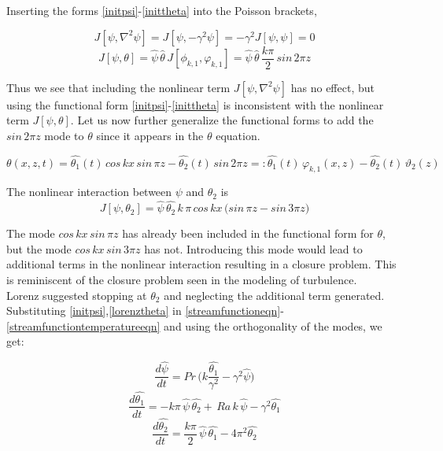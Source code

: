 \documentclass[paper=a4, fontsize=11pt]{scrartcl}
\numberwithin{equation}{section}		%
\numberwithin{figure}{section}			%
\numberwithin{table}{section}				%
\begin{document}
\noindent Inserting the forms \ref{initpsi}-\ref{inittheta} into the Poisson brackets,

\begin{equation}
	J[\psi, \nabla^2 \psi] = J[\psi, -\gamma^2 \psi] = -\gamma^2 J[\psi, \psi] = 0
\end{equation}
\begin{equation}
	J[\psi, \theta] = \hat{\psi} \, \hat{\theta} \, J[\phi_{k,1}, \varphi_{k,1}] = \hat{\psi} \, \hat{\theta} \, \frac{k \pi}{2} \, sin \, 2 \pi z
\end{equation}

Thus we see that including the nonlinear term $J[\psi, \nabla^2 \psi]$ has no effect, but using the functional form \ref{initpsi}-\ref{inittheta} is inconsistent with the nonlinear term $J[\psi, \theta]$. Let us now further generalize the functional forms to add the $sin \, 2 \pi z$ mode to $\theta$ since it appears in the $\theta$ equation.

\begin{equation}
	\theta(x,z,t) = \hat{\theta_1}(t) \, cos \, kx  \, sin \, \pi z - \hat{\theta_2}(t) \, sin \, 2 \pi z =: \hat{\theta_1}(t) \, \varphi_{k,1}(x,z) - \hat{\theta_2}(t) \, \vartheta_2(z)
	\label{lorenztheta}
\end{equation}

\noindent The nonlinear interaction between $\psi$ and $\theta_2$ is
\begin{equation}
	J[\psi, \theta_2] =  \hat{\psi} \, \hat{\theta_2} \, k \, \pi \, cos \, kx \,\bigl(sin \, \pi z - sin \, 3 \pi z\bigr)
\end{equation}

The mode $cos \, kx  \, sin \, \pi z$ has already been included in the functional form for $\theta$, but the mode $cos \, kx  \, sin \, 3 \pi z$ has not. Introducing this mode would lead to additional terms in the nonlinear interaction resulting in a closure problem. This is reminiscent of the closure problem seen in the modeling of turbulence. \\

Lorenz suggested stopping at $\theta_2$ and neglecting the additional term generated. Substituting \ref{initpsi},\ref{lorenztheta} in \ref{streamfunctioneqn}-\ref{streamfunctiontemperatureeqn} and using the orthogonality of the modes, we get:

\begin{equation}
	\frac{d\hat{\psi}}{d t} = Pr \, \biggl(k \frac{\hat{\theta_1}}{\gamma^2} - \gamma^2 \hat{\psi}\biggr)
	\label{dimlrzx}
\end{equation}
\begin{equation}
	\frac{d\hat{\theta_1}}{d t} = - k\pi \, \hat{\psi} \, \hat{\theta_2} + \, Ra \, k\,  \hat{\psi} - \gamma^2 \hat{\theta_1}
\end{equation}
\begin{equation}
	\frac{d\hat{\theta_2}}{d t} = \frac{k \pi}{2} \, \hat{\psi}\,\hat{\theta_1} - 4 \pi^2  \hat{\theta_2}
\end{equation}
\end{document}
